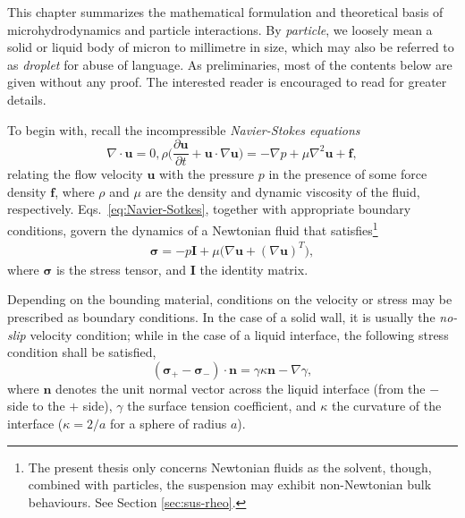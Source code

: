 This chapter summarizes the mathematical formulation and theoretical basis of microhydrodynamics and particle interactions.
By \emph{particle}, we loosely mean a solid or liquid body of micron to millimetre in size, which may also be referred to as \emph{droplet} for abuse of language.
As preliminaries, most of the contents below are given without any proof. The interested reader is encouraged to read \cite{Batchelor, hb, ps, kim_karrila, graham_2018} for greater details.

\bigskip

To begin with, recall the incompressible \emph{Navier-Stokes equations}
\begin{subequations} \label{eq:Navier-Sotkes}
 \begin{equation}
   \nabla \cdot {\bm u} = 0,
  \label{eq:div-free}
 \end{equation}
 \begin{equation}
   \rho \bigg(\frac{\partial {\bm u}}{\partial t} + {\bm u} \cdot \nabla {\bm u} \bigg) = -\nabla p + \mu \nabla ^2  {\bm u} + {\bm f},
  \label{eq:NS}
 \end{equation}
\end{subequations}
relating the flow velocity $\bm u$ with the pressure $p$ in the presence of some force density $\bm f$, where $\rho$ and $\mu$ are the density and dynamic viscosity of the fluid, respectively.
Eqs.\ \eqref{eq:Navier-Sotkes}, together with appropriate boundary conditions, govern the dynamics of a Newtonian fluid that satisfies\footnote{The present thesis only concerns Newtonian fluids as the solvent, though, combined with particles, the suspension may exhibit non-Newtonian bulk behaviours. See Section \ref{sec:sus-rheo}.}
\begin{equation}
 \begin{aligned}
   {\bm \sigma} = -p {\bm I}+ \mu \bigg( \nabla {\bm u} + (\nabla {\bm u})^T \bigg),
 \end{aligned}
\end{equation}
where $\bm \sigma$ is the stress tensor, and $\bm I$ the identity matrix.

Depending on the bounding material, conditions on the velocity or stress may be prescribed as boundary conditions. In the case of a solid wall, it is usually the \emph{no-slip} velocity condition; while in the case of a liquid interface, the following stress condition shall be satisfied,
\begin{equation} \label{eq:stress-bc}
  ({\bm \sigma}_+ - {\bm \sigma}_- ) \cdot {\bm n} = \gamma \kappa {\bm n} - \nabla \gamma,
\end{equation}
where $\bm n$ denotes the unit normal vector across the liquid interface (from the $-$ side to the $+$ side), $\gamma$ the surface tension coefficient, and $\kappa$ the curvature of the interface (\eg $\kappa=2/a$ for a sphere of radius $a$). 

